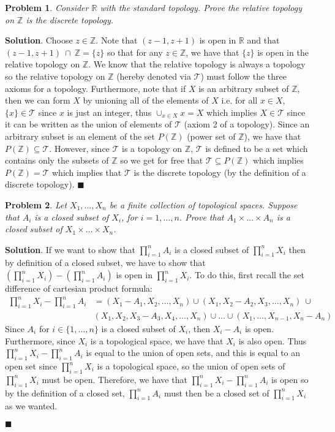 \documentclass[12pt]{article}
\renewcommand{\=}[1]{\stackrel{#1}{=}} %
\providecommand{\RR}{\mathbb{R}}
\providecommand{\T}{\mathcal{T}}
\newtheorem{p}{Problem}[section]
\theoremstyle{definition}
\newenvironment{s}{%
        \begin{trivlist} \item \textbf{Solution}. }{%
            \hspace*{\fill} $\blacksquare$\end{trivlist}}%
\begin{document}
\begin{p}
    Consider $\RR$ with the standard topology. Prove the relative topology on $\mathbb{Z}$ is the discrete topology.
\end{p}
\begin{s}
    Choose $z\in\mathbb{Z}$. Note that $(z-1,z+1)$ is open in $\RR$ and that $(z-1,z+1)\:\cap\:\mathbb{Z} = \{z\}$ so that for any
    $z\in\mathbb{Z}$, we have that $\{z\}$ is open in the relative topology on $\mathbb{Z}$. We know that the relative topology is always a topology
    so the relative topology on $\mathbb{Z}$ (hereby denoted via $\T$) must follow the three axioms for a topology. Furthermore, note that if
    $X$ is an arbitrary subset of $\mathbb{Z}$, then we can form $X$ by unioning all of the elements of $X$ i.e. for all $x\in X$,
    $\{x\}\in\T$ since $x$ is just an integer, thus $\cup_{x\in X} x = X$ which implies $X\in\T$ since it can be written as the union of elements
    of $\T$ (axiom 2 of a topology). Since an arbitrary subset is an element of the set $P(\mathbb{Z})$ (power set of $\mathbb{Z}$), we have that
    $P(\mathbb{Z}) \subseteq \T$. However, since $\T$ is a topology on $\mathbb{Z}$, $\T$ is defined to be a set which contains only the subsets
    of $\mathbb{Z}$ so we get for free that $\T \subseteq P(\mathbb{Z})$ which implies $P(\mathbb{Z}) = \T$ which implies that $\T$ is the discrete
    topology (by the definition of a discrete topology).
\end{s}

\begin{p}
    Let $X_1,\hdots,X_n$ be a finite collection of topological spaces. Suppose that $A_i$ is a closed subset of $X_i$, for $i=1,\hdots,n$. Prove
    that $A_1\times\hdots\times A_n$ is a closed subset of $X_1\times\hdots\times X_n$.
\end{p}
\begin{s}
    If we want to show that $\prod_{i=1}^n A_i$ is a closed subset of $\prod_{i=1}^n X_i$ then by definition of a closed subset, we have to show
    that $(\prod_{i=1}^n X_i) - (\prod_{i=1}^n A_i)$ is open in $\prod_{i=1}^n X_i$. To do this, first recall the set difference of cartesian
    product formula:
    \begin{align*}
        \prod_{i=1}^n X_i - \prod_{i=1}^n A_i &= (X_1-A_1,X_2,\hdots,X_n) \cup (X_1, X_2-A_2, X_3, \hdots, X_n)\: \cup \\
            &(X_1, X_2, X_3-A_3, X_4, \hdots, X_n) \cup \hdots \cup (X_1,\hdots,X_{n-1},X_n-A_n)
    \end{align*}
    Since $A_i$ for $i\in\{1,\hdots,n\}$ is a closed subset of $X_i$, then $X_i - A_i$ is open. Furthermore, since $X_i$ is a topological space,
    we have that $X_i$ is also open. Thus $\prod_{i=1}^n X_i - \prod_{i=1}^n A_i$ is equal to the union of open sets, and this is equal to an open
    set since $\prod_{i=1}^n X_i$ is a topological space, so the union of open sets of $\prod_{i=1}^n X_i$ must be open. Therefore, we have that
    $\prod_{i=1}^n X_i - \prod_{i=1}^n A_i$ is open so by the definition of a closed set, $\prod_{i=1}^n A_i$ must then be a closed set of
    $\prod_{i=1}^n X_i$ as we wanted.

\end{s}
\end{document}
